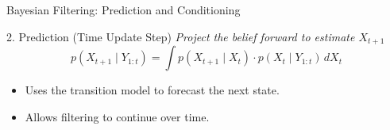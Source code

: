 \documentclass[handout,aspectratio=169]{beamer}
\begin{document}
\begin{frame}{Bayesian Filtering: Prediction and Conditioning}
\begin{block}{2. Prediction (Time Update Step)}
\textit{Project the belief forward to estimate \( X_{t+1} \)}
\[
p(X_{t+1} \mid Y_{1:t}) = \int p(X_{t+1} \mid X_t) \cdot p(X_t \mid Y_{1:t}) \, dX_t \tag{3.9}
\]
\begin{itemize}
  \item Uses the transition model to forecast the next state.
  \item Allows filtering to continue over time.
\end{itemize}
\end{block}

\end{frame}










{
	\begin{frame}
	\end{frame}}
\end{document}

